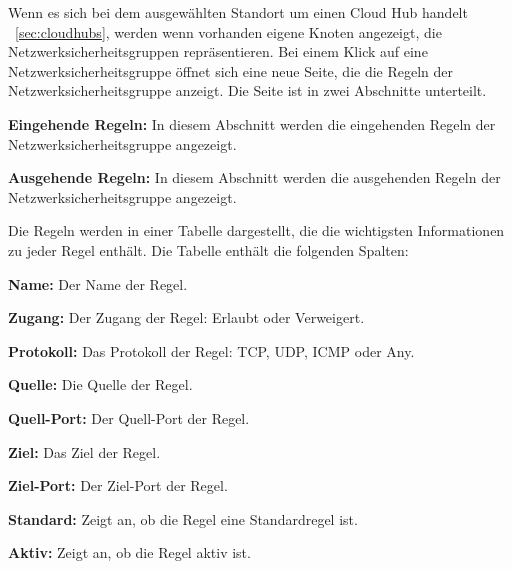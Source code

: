 \begin{compactitem}
\begin{compactitem}
\begin{compactitem}
\begin{compactitem}
\begin{compactitem}
                    Wenn es sich bei dem ausgewählten Standort um einen Cloud Hub handelt ~\ref{sec:cloudhubs},
                    werden wenn vorhanden eigene Knoten angezeigt, die Netzwerksicherheitsgruppen repräsentieren.
                    Bei einem Klick auf eine Netzwerksicherheitsgruppe öffnet sich eine neue Seite, 
                    die die Regeln der Netzwerksicherheitsgruppe anzeigt.
                    Die Seite ist in zwei Abschnitte unterteilt.
                    \begin{compactitem}
                        \item \textbf{Eingehende Regeln:} In diesem Abschnitt werden die eingehenden Regeln der Netzwerksicherheitsgruppe angezeigt.
                        \item \textbf{Ausgehende Regeln:} In diesem Abschnitt werden die ausgehenden Regeln der Netzwerksicherheitsgruppe angezeigt.
                    \end{compactitem}
                    Die Regeln werden in einer Tabelle dargestellt, die die wichtigsten Informationen zu jeder Regel enthält.
                    Die Tabelle enthält die folgenden Spalten:
                    \begin{compactitem}
                        \item \textbf{Name:} Der Name der Regel.
                        \item \textbf{Zugang:} Der Zugang der Regel: Erlaubt oder Verweigert.
                        \item \textbf{Protokoll:} Das Protokoll der Regel: TCP, UDP, ICMP oder Any.
                        \item \textbf{Quelle:} Die Quelle der Regel.
                        \item \textbf{Quell-Port:} Der Quell-Port der Regel.
                        \item \textbf{Ziel:} Das Ziel der Regel.
                        \item \textbf{Ziel-Port:} Der Ziel-Port der Regel.
                        \item \textbf{Standard:} Zeigt an, ob die Regel eine Standardregel ist.
                        \item \textbf{Aktiv:} Zeigt an, ob die Regel aktiv ist.
                    \end{compactitem}


\end{compactitem}
\end{compactitem}
\end{compactitem}
\end{compactitem}
\end{compactitem}
